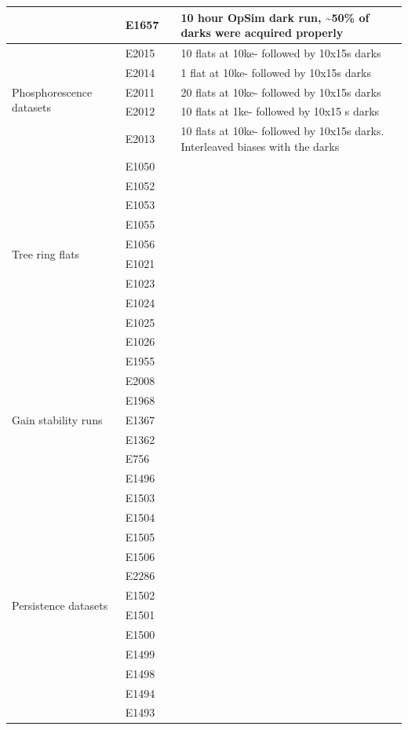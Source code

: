 \begin{longtable}{|p{2cm}|p{2cm}|p{2cm}|p{10cm}|}
& E1657 & & 10 hour OpSim dark run, \textasciitilde50\% of darks were
acquired properly \\ \hline
\multirow{5}{=}{Phosphorescence datasets} & E2015 & & 10 flats at 10ke- followed by 10x15s darks \\ 
& E2014 & & 1 flat at 10ke- followed by 10x15s darks \\ \hline
& E2011 & & 20 flats at 10ke- followed by 10x15s darks \\ \hline
& E2012 & & 10 flats at 1ke- followed by 10x15 s darks \\ \hline
& E2013 & & 10 flats at 10ke- followed by 10x15s darks. Interleaved biases with the darks \\ \hline
\multirow{10}{=}{Tree ring flats} & E1050 & & \\ 
& E1052 & & \\ \hline
& E1053 & & \\ \hline
& E1055 & & \\ \hline
& E1056 & & \\ \hline
& E1021 & & \\ \hline
& E1023 & & \\ \hline
& E1024 & & \\ \hline
& E1025 & & \\ \hline
& E1026 & & \\ \hline
\multirow{7}{=}{Gain stability runs} & E1955 & & \\ 
& E2008 & & \\ \hline
& E1968 & & \\ \hline
& E1367 & & \\ \hline
& E1362 & & \\ \hline
& E756 & & \\ \hline
& E1496 & & \\ \hline
\multirow{25}{=}{Persistence datasets} & E1503 & & \\ 
& E1504 & & \\ \hline
& E1505 & & \\ \hline
& E1506 & & \\ \hline
& E2286 & & \\ \hline
& E1502 & & \\ \hline
& E1501 & & \\ \hline
& E1500 & & \\ \hline
& E1499 & & \\ \hline
& E1498 & & \\ \hline
& E1494 & & \\ \hline
& E1493 & & \\ \hline

\end{longtable}
